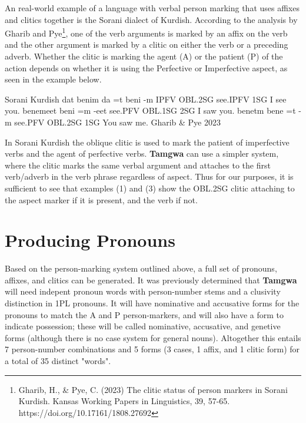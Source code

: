 \documentclass[a4paper,12pt,twoside,openright]{memoir}
\begin{document}
    An real-world example of a language with verbal person marking that uses affixes and clitics together is the Sorani dialect of Kurdish.  According to the analysis by Gharib and Pye\footnote{Gharib, H., \& Pye, C. (2023) The clitic status of person markers in Sorani Kurdish. Kansas Working Papers in Linguistics, 39, 57-65. https://doi.org/10.17161/1808.27692}, one of the verb arguments is marked by an affix on the verb and the other argument is marked by a clitic on either the verb or a preceding adverb.  Whether the clitic is marking the agent (A) or the patient (P) of the action depends on whether it is using the Perfective or Imperfective aspect, as seen in the example below.

\begin{examples}
    \ex
    \lect Sorani Kurdish
    \words {} dat  benim
    \bits da =t beni -m
    \gloss IPFV OBL.2SG see.IPFV 1SG
    \tr I see you.
    \ex
    \words {} benemeet
    \bits beni =m -eet
    \gloss see.PFV OBL.1SG 2SG
    \tr I saw you.
    \ex
    \words {} benetm
    \bits bene =t -m
    \gloss see.PFV OBL.2SG 1SG
    \tr You saw me.
    \source Gharib \& Pye 2023
\end{examples}

    In Sorani Kurdish the oblique clitic is used to mark the patient of imperfective verbs and the agent of perfective verbs.  \textbf{Tamgwa} can use a simpler system, where the clitic marks the same verbal argument and attaches to the first verb/adverb in the verb phrase regardless of aspect.  Thus for our purposes, it is sufficient to see that examples (1) and (3) show the OBL.2SG clitic attaching to the aspect marker if it is present, and the verb if not.

\section*{Producing Pronouns}

    Based on the person-marking system outlined above, a full set of pronouns, affixes, and clitics can be generated.  It was previously determined that \textbf{Tamgwa} will need indepent pronoun words with person-number stems and a clusivity distinction in 1PL pronouns.  It will have nominative and accusative forms for the pronouns to match the A and P person-markers, and will also have a form to indicate possession; these will be called nominative, accusative, and genetive forms (although there is no case system for general nouns).  Altogether this entails 7 person-number combinations and 5 forms (3 cases, 1 affix, and 1 clitic form) for a total of 35 distinct "words".
\end{document}
